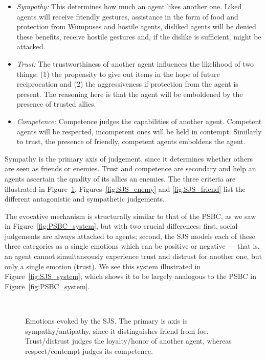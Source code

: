 \begin{itemize}
	\item \emph{Sympathy:} This determines how much an agent likes another one. Liked agents will receive friendly gestures, assistance in the form of food and protection from Wumpuses and hostile agents, disliked agents will be denied these benefits, receive hostile gestures and, if the dislike is sufficient, might be attacked.
	\item \emph{Trust:} The trustworthiness of another agent influences the likelihood of two things: (1) the propensity to give out items in the hope of future reciprocation and (2) the aggressiveness if protection from the agent is present. The reasoning here is that the agent will be emboldened by the presence of trusted allies.
	\item \emph{Competence:} Competence judges the capabilities of another agent. Competent agents will be respected, incompetent ones will be held in contempt. Similarly to trust, the presence of friendly, competent agents emboldens the agent.
\end{itemize}

Sympathy is the primary axis of judgement, since it determines whether others are seen as friends or enemies. Trust and competence are secondary and help an agents ascertain the quality of its allies an enemies. The three criteria are illustrated in Figure~\ref{fig:SJS}. Figures~\ref{fig:SJS_enemy} and \ref{fig:SJS_friend} list the different antagonistic and sympathetic judgements.

The evocative mechanism is structurally similar to that of the PSBC, as we saw in Figure~\ref{fig:PSBC_system}, but with two crucial differences: first, social judgements are always attached to agents; second, the SJS models each of these three categories as a single emotions which can be positive or negative --- that is, an agent cannot simultaneously experience trust and distrust for another one, but only a single emotion (trust). We see this system illustrated in Figure~\ref{fig:SJS_system}, which shows it to be largely analogous to the PSBC in Figure~\ref{fig:PSBC_system}.

\begin{figure}[t]
	\centering
	\\
	\caption{Emotions evoked by the SJS. The primary is axis is sympathy/antipathy, since it distinguishes friend from foe. Trust/distrust judges the loyalty/honor of another agent, whereas respect/contempt judges its competence.}
	\label{fig:SJS}
\end{figure}

